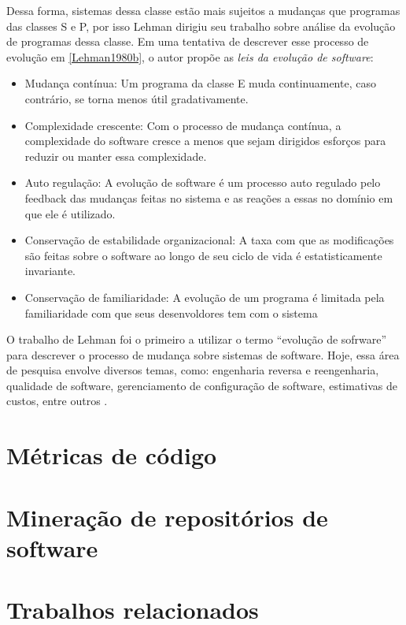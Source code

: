 \documentclass[a4paper, 12pt, twoside]{book}
\begin{document}
        Dessa forma, sistemas dessa classe estão mais sujeitos a mudanças que programas das classes S e P, por isso
        Lehman dirigiu seu trabalho sobre análise da evolução de programas dessa classe. Em uma tentativa de descrever
        esse processo de evolução em \ref{Lehman1980b}, o autor propõe as \textit{leis da evolução de software}:
        \begin{itemize}
            \item Mudança contínua: Um programa da classe E muda continuamente, caso contrário, se torna menos útil 
                  gradativamente.
            \item Complexidade crescente: Com o processo de mudança contínua, a complexidade do software cresce a menos
                  que sejam dirigidos esforços para reduzir ou manter essa complexidade.
            \item Auto regulação: A evolução de software é um processo auto regulado pelo feedback das mudanças
                  feitas no sistema e as reações a essas no domínio em que ele é utilizado.
            \item Conservação de estabilidade organizacional: A taxa com que as modificações são feitas sobre
                  o software ao longo de seu ciclo de vida é estatisticamente invariante.
            \item Conservação de familiaridade: A evolução de um programa é limitada pela familiaridade com que
                  seus desenvoldores tem com o sistema
        \end{itemize}

        O trabalho de Lehman foi o primeiro a utilizar o termo ``evolução de sofrware'' para descrever o processo de mudança
        sobre sistemas de software. Hoje, essa área de pesquisa envolve diversos temas, como: engenharia reversa e reengenharia, 
        qualidade de software, gerenciamento de configuração de software, estimativas de custos, entre outros \cite{DBLP:series/springer/Mens08}.
        
    \section{Métricas de código}
    
    \section{Mineração de repositórios de software}

    \section{Trabalhos relacionados} \label{ch:trabalhos}
    
\end{document}
